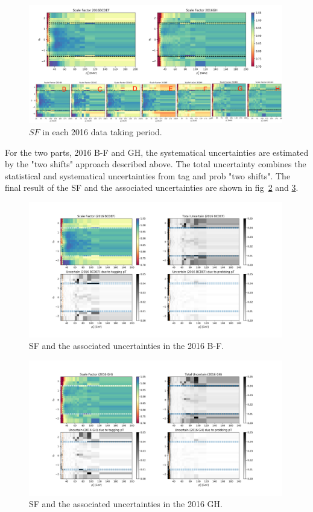 \begin{figure}
    \centering
    \includegraphics[width=0.99\textwidth]{chapters/Appendix/sectionEleTrigger/figures/eTrSF_value.png}
    \caption{$SF$ in each 2016 data taking period.}
    \label{fig:appendix:ele27SFperiods}
\end{figure}





For the two parts, 2016 B-F and GH, the systematical uncertainties are estimated by the "two shifts" approach described above. 
The total uncertainty combines the statistical and systematical uncertainties from tag and prob "two shifts".
The final result of the SF and the associated uncertainties are shown in fig~\ref{fig:eTrSF_err_BCDEF} and \ref{fig:eTrSF_err_GH}.

\begin{figure}
    \centering
    \includegraphics[width=0.99\textwidth]{chapters/Appendix/sectionEleTrigger/figures/result_BCDEF.png}
    
    \caption{SF and the associated uncertainties in the 2016 B-F.}
    \label{fig:eTrSF_err_BCDEF}
\end{figure}

\begin{figure}
    \centering
    \includegraphics[width=0.99\textwidth]{chapters/Appendix/sectionEleTrigger/figures/result_GH.png}
    
    \caption{SF and the associated uncertainties in the 2016 GH.}
    \label{fig:eTrSF_err_GH}
\end{figure}

\FloatBarrier
